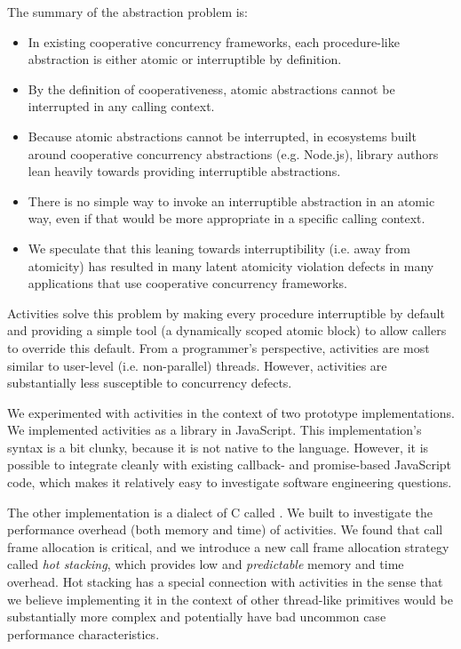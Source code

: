 \documentclass[preprint, 10pt, numbers]{sigplanconf}
\begin{document}
The summary of the abstraction problem is:

\begin{itemize}
\item In existing cooperative concurrency frameworks, each procedure-like abstraction is either atomic or interruptible by definition.
\item By the definition of cooperativeness, atomic abstractions cannot be interrupted in any calling context.
\item Because atomic abstractions cannot be interrupted, in ecosystems built around cooperative concurrency abstractions (e.g. Node.js), library authors lean heavily towards providing interruptible abstractions.
\item There is no simple way to invoke an interruptible abstraction in an atomic way, even if that would be more appropriate in a specific calling context.
\item We speculate that this leaning towards interruptibility (i.e. away from atomicity) has resulted in many latent atomicity violation defects in many applications that use cooperative concurrency frameworks.
\end{itemize}

Activities solve this problem by making every procedure interruptible by default and providing a simple tool (a dynamically scoped atomic block) to allow callers to override this default.
From a programmer's perspective, activities are most similar to user-level (i.e. non-parallel) threads.
However, activities are substantially less susceptible to concurrency defects.

We experimented with activities in the context of two prototype implementations.
We implemented activities as a library in JavaScript.
This implementation's syntax is a bit clunky, because it is not native to the language.
However, it is possible to integrate cleanly with existing callback- and promise-based JavaScript code, which makes it relatively easy to investigate software engineering questions.

The other implementation is a dialect of C called \charcoal{}.
We built \charcoal{} to investigate the performance overhead (both memory and time) of activities.
We found that call frame allocation is critical, and we introduce a new call frame allocation strategy called \emph{hot stacking}, which provides low and \emph{predictable} memory and time overhead.
Hot stacking has a special connection with activities in the sense that we believe implementing it in the context of other thread-like primitives would be substantially more complex and potentially have bad uncommon case performance characteristics.
\end{document}
